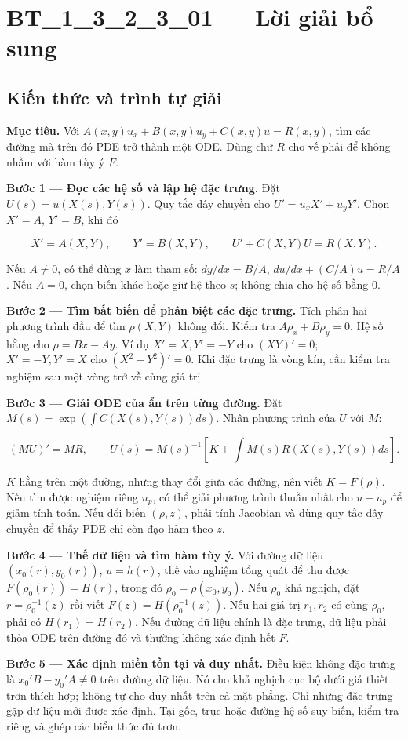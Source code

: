 \documentclass[10pt,a4paper]{article}
\begin{document}
\section*{BT\_1\_3\_2\_3\_01 — Lời giải bổ sung}
\subsection*{Kiến thức và trình tự giải}
\textbf{Mục tiêu.} Với $A(x,y)u_x+B(x,y)u_y+C(x,y)u=R(x,y)$, tìm các đường mà trên đó PDE trở thành một ODE. Dùng chữ $R$ cho vế phải để không nhầm với hàm tùy ý $F$.

\textbf{Bước 1 — Đọc các hệ số và lập hệ đặc trưng.} Đặt $U(s)=u(X(s),Y(s))$. Quy tắc dây chuyền cho $U'=u_xX'+u_yY'$. Chọn $X'=A$, $Y'=B$, khi đó

\[
X'=A(X,Y),\qquad Y'=B(X,Y),\qquad U'+C(X,Y)U=R(X,Y).
\]

Nếu $A\ne0$, có thể dùng $x$ làm tham số: $dy/dx=B/A$, $du/dx+(C/A)u=R/A$. Nếu $A=0$, chọn biến khác hoặc giữ hệ theo $s$; không chia cho hệ số bằng 0.

\textbf{Bước 2 — Tìm bất biến để phân biệt các đặc trưng.} Tích phân hai phương trình đầu để tìm $\rho(X,Y)$ không đổi. Kiểm tra $A\rho_x+B\rho_y=0$. Hệ số hằng cho $\rho=Bx-Ay$. Ví dụ $X'=X,Y'=-Y$ cho $(XY)'=0$; $X'=-Y,Y'=X$ cho $(X^2+Y^2)'=0$. Khi đặc trưng là vòng kín, cần kiểm tra nghiệm sau một vòng trở về cùng giá trị.

\textbf{Bước 3 — Giải ODE của ẩn trên từng đường.} Đặt $M(s)=\exp(\int C(X(s),Y(s))ds)$. Nhân phương trình của $U$ với $M$:

\[
(MU)'=MR,\qquad
U(s)=M(s)^{-1}\left[K+\int M(s)R(X(s),Y(s))ds\right].
\]

$K$ hằng trên một đường, nhưng thay đổi giữa các đường, nên viết $K=F(\rho)$. Nếu tìm được nghiệm riêng $u_p$, có thể giải phương trình thuần nhất cho $u-u_p$ để giảm tính toán. Nếu đổi biến $(\rho,z)$, phải tính Jacobian và dùng quy tắc dây chuyền để thấy PDE chỉ còn đạo hàm theo $z$.

\textbf{Bước 4 — Thế dữ liệu và tìm hàm tùy ý.} Với đường dữ liệu $(x_0(r),y_0(r))$, $u=h(r)$, thế vào nghiệm tổng quát để thu được $F(\rho_0(r))=H(r)$, trong đó $\rho_0=\rho(x_0,y_0)$. Nếu $\rho_0$ khả nghịch, đặt $r=\rho_0^{-1}(z)$ rồi viết $F(z)=H(\rho_0^{-1}(z))$. Nếu hai giá trị $r_1,r_2$ có cùng $\rho_0$, phải có $H(r_1)=H(r_2)$. Nếu đường dữ liệu chính là đặc trưng, dữ liệu phải thỏa ODE trên đường đó và thường không xác định hết $F$.

\textbf{Bước 5 — Xác định miền tồn tại và duy nhất.} Điều kiện không đặc trưng là $x_0'B-y_0'A\ne0$ trên đường dữ liệu. Nó cho khả nghịch cục bộ dưới giả thiết trơn thích hợp; không tự cho duy nhất trên cả mặt phẳng. Chỉ những đặc trưng gặp dữ liệu mới được xác định. Tại gốc, trục hoặc đường hệ số suy biến, kiểm tra riêng và ghép các biểu thức đủ trơn.
\end{document}
